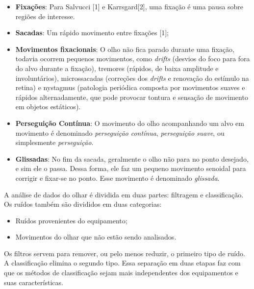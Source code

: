 \documentclass[brazil,]{report}
\begin{document}
\begin{itemize}
\itemsep1pt\parskip0pt
\item
  \textbf{Fixações}: Para Salvucci {[}1{]} e Karrsgard{[}2{]}, uma
  fixação é uma pausa sobre regiões de interesse.
\item
  \textbf{Sacadas}: Um rápido movimento entre fixações {[}1{]};
\item
  \textbf{Movimentos fixacionais}: O olho não fica parado durante uma
  fixação, todavia ocorrem pequenos movimentos, como \emph{drifts}
  (desvios do foco para fora do alvo durante a fixação), tremores
  (rápidos, de baixa amplitude e involuntários), microssacadas
  (correções dos \emph{drifts} e renovação do estímulo na retina) e
  nystagmus (patologia periódica composta por movimentos suaves e
  rápidos alternadamente, que pode provocar tontura e sensação de
  movimento em objetos estáticos).
\item
  \textbf{Perseguição Contínua}: O movimento do olho acompanhando um
  alvo em movimento é denominado \emph{perseguição contínua},
  \emph{perseguição suave}, ou simplesmente \emph{perseguição}.
\item
  \textbf{Glissadas}: No fim da sacada, geralmente o olho não para no
  ponto desejado, e sim ele o passa. Dessa forma, ele faz um pequeno
  movimento senoidal para corrigir e fixar-se no ponto. Esse movimento é
  denominado \emph{glissada}.
\end{itemize}


A análise de dados do olhar é dividida em duas partes: filtragem e
classificação. Os ruídos também são divididos em duas categorias:

\begin{itemize}
\itemsep1pt\parskip0pt
\item
  Ruídos provenientes do equipamento;
\item
  Movimentos do olhar que não estão sendo analisados.
\end{itemize}

Os filtros servem para remover, ou pelo menos reduzir, o primeiro tipo
de ruído. A classificação elimina o segundo tipo. Essa separação em duas
etapas faz com que os métodos de classificação sejam mais independentes
dos equipamentos e suas características.
\end{document}
